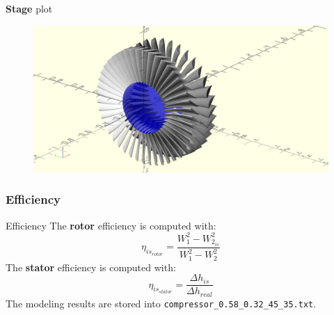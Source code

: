 	\begin{frame}{\textbf{Stage} plot}
		\begin{figure}
			\centering
			\includegraphics[width=1\textwidth]{figures/compressor.png}
		\end{figure}
	\end{frame}

\subsubsection{Efficiency}
	\begin{frame}[fragile]{Efficiency}
		The \textbf{rotor} efficiency is computed with:
		\begin{equation}
			\eta_{is_{rotor}} = \frac{W_1^2 - W_{2_{is}}^2}{W_1^2 - W_{2}^2} \nonumber 
		\end{equation}
		The \textbf{stator} efficiency is computed with:
		\begin{equation}
			\eta_{is_{stator}} = \frac{\Delta h_{is}}{\Delta h_{real}} \nonumber 
		\end{equation}
		The modeling results are stored into \verb|compressor_0.58_0.32_45_35.txt|.
	\end{frame}
